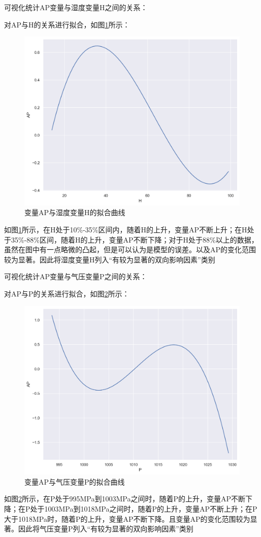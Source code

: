 \documentclass[bwprint]{gmcmthesis}
\numberwithin{figure}{section}
\begin{document}
 可视化统计AP变量与湿度变量H之间的关系：

对AP与H的关系进行拟合，如图\ref{fig3-8}所示：
\begin{figure}[!h]
	\centering
	\includegraphics[width=.7\textwidth]{figures//fig_H_fit.png}
	\caption{变量AP与湿度变量H的拟合曲线}
	\label{fig3-8}
\end{figure}

如图\ref{fig3-8}所示，在H处于10\%-35\%区间内，随着H的上升，变量AP不断上升；在H处于35\%-88\%区间，随着H的上升，变量AP不断下降；对于H处于88\%以上的数据，虽然在图中有一点略微的凸起，但是可以认为是模型的误差。以及AP的变化范围较为显著。因此将湿度变量H列入“有较为显著的双向影响因素”类别

 可视化统计AP变量与气压变量P之间的关系：

对AP与P的关系进行拟合，如图\ref{fig3-9}所示：
\begin{figure}[!h]
	\centering
	\includegraphics[width=.7\textwidth]{figures//fig_P_fit.png}
	\caption{变量AP与气压变量P的拟合曲线}
	\label{fig3-9}
\end{figure}

如图\ref{fig3-9}所示，在P处于995MPa到1003MPa之间时，随着P的上升，变量AP不断下降；在P处于1003MPa到1018MPa之间时，随着P的上升，变量AP不断上升；在P大于1018MPa时，随着P的上升，变量AP不断下降。且变量AP的变化范围较为显著。因此将气压变量P列入“有较为显著的双向影响因素”类别
\end{document}
